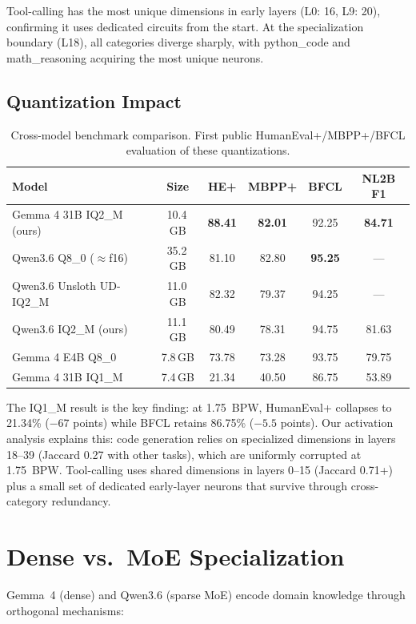 \documentclass[11pt,a4paper]{article}
\begin{document}
Tool-calling has the most unique dimensions in early layers (L0: 16, L9: 20), confirming it uses dedicated circuits from the start. At the specialization boundary (L18), all categories diverge sharply, with python\_code and math\_reasoning acquiring the most unique neurons.

\subsection{Quantization Impact}

\begin{table}[H]
\centering
\caption{Cross-model benchmark comparison. First public HumanEval+/MBPP+/BFCL evaluation of these quantizations.}
\label{tab:benchmarks}
\begin{tabular}{lccccc}
\toprule
\textbf{Model} & \textbf{Size} & \textbf{HE+} & \textbf{MBPP+} & \textbf{BFCL} & \textbf{NL2B F1} \\
\midrule
Gemma 4 31B IQ2\_M (ours) & 10.4\,GB & \textbf{88.41} & \textbf{82.01} & 92.25 & \textbf{84.71} \\
Qwen3.6 Q8\_0 ($\approx$f16) & 35.2\,GB & 81.10 & 82.80 & \textbf{95.25} & --- \\
Qwen3.6 Unsloth UD-IQ2\_M & 11.0\,GB & 82.32 & 79.37 & 94.25 & --- \\
Qwen3.6 IQ2\_M (ours) & 11.1\,GB & 80.49 & 78.31 & 94.75 & 81.63 \\
Gemma 4 E4B Q8\_0 & 7.8\,GB & 73.78 & 73.28 & 93.75 & 79.75 \\
Gemma 4 31B IQ1\_M & 7.4\,GB & 21.34 & 40.50 & 86.75 & 53.89 \\
\bottomrule
\end{tabular}
\end{table}

The IQ1\_M result is the key finding: at 1.75~BPW, HumanEval+ collapses to 21.34\% ($-67$ points) while BFCL retains 86.75\% ($-5.5$ points). Our activation analysis explains this: code generation relies on specialized dimensions in layers 18--39 (Jaccard 0.27 with other tasks), which are uniformly corrupted at 1.75~BPW. Tool-calling uses shared dimensions in layers 0--15 (Jaccard 0.71+) plus a small set of dedicated early-layer neurons that survive through cross-category redundancy.

\section{Dense vs.\ MoE Specialization}

Gemma~4 (dense) and Qwen3.6 (sparse MoE) encode domain knowledge through orthogonal mechanisms:
\end{document}
